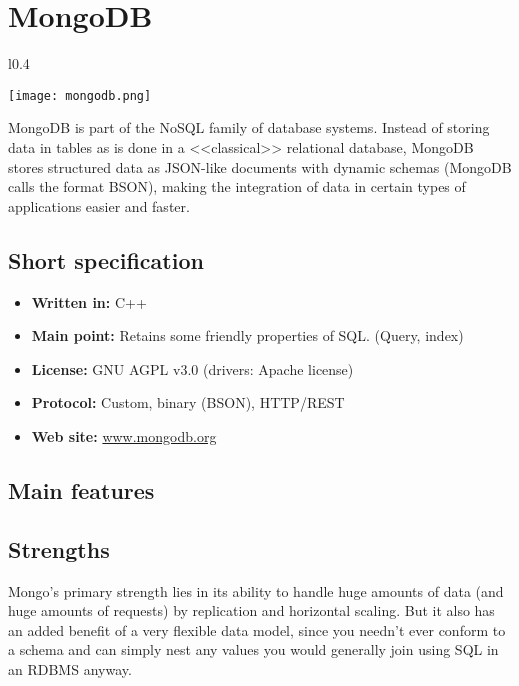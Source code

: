 \chapter{MongoDB}

\begin{wrapfigure}{l}{0.4\textwidth}
  \vspace{-75pt}
  \begin{center}
    \texttt{[image: mongodb.png]}
  \end{center}
  \vspace{-30pt}
\end{wrapfigure}
MongoDB is part of the NoSQL family of database systems. Instead of storing data in tables as is done in a <<classical>> relational database, MongoDB stores structured data as JSON-like documents with dynamic schemas (MongoDB calls the format BSON), making the integration of data in certain types of applications easier and faster.

\section{Short specification}

\begin{itemize}
  \item \textbf{Written in:} C++
  \item \textbf{Main point:} Retains some friendly properties of SQL. (Query, index)
  \item \textbf{License:} GNU AGPL v3.0 (drivers: Apache license)
  \item \textbf{Protocol:} Custom, binary (BSON), HTTP/REST
  \item \textbf{Web site:} \href{http://www.mongodb.org/}{www.mongodb.org}
\end{itemize}

\section{Main features}

\section{Strengths}

Mongo's primary strength lies in its ability to handle huge amounts of data (and huge amounts of requests) by replication and horizontal scaling. But it also has an added benefit of a very flexible data model, since you needn’t ever conform to a schema and can simply nest any values you would generally join using SQL in an RDBMS anyway.

